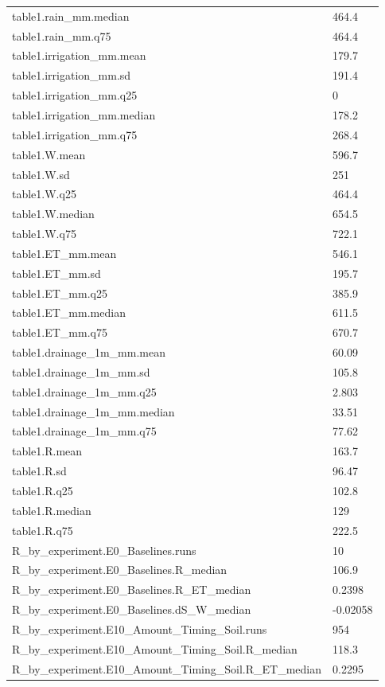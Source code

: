 {\begin{longtable}{p{}p{}}
{}table1.rain\_mm.median & 464.4\\
{}table1.rain\_mm.q75 & 464.4\\
{}table1.irrigation\_mm.mean & 179.7\\
{}table1.irrigation\_mm.sd & 191.4\\
{}table1.irrigation\_mm.q25 & 0\\
{}table1.irrigation\_mm.median & 178.2\\
{}table1.irrigation\_mm.q75 & 268.4\\
{}table1.W.mean & 596.7\\
{}table1.W.sd & 251\\
{}table1.W.q25 & 464.4\\
{}table1.W.median & 654.5\\
{}table1.W.q75 & 722.1\\
{}table1.ET\_mm.mean & 546.1\\
{}table1.ET\_mm.sd & 195.7\\
{}table1.ET\_mm.q25 & 385.9\\
{}table1.ET\_mm.median & 611.5\\
{}table1.ET\_mm.q75 & 670.7\\
{}table1.drainage\_1m\_mm.mean & 60.09\\
{}table1.drainage\_1m\_mm.sd & 105.8\\
{}table1.drainage\_1m\_mm.q25 & 2.803\\
{}table1.drainage\_1m\_mm.median & 33.51\\
{}table1.drainage\_1m\_mm.q75 & 77.62\\
{}table1.R.mean & 163.7\\
{}table1.R.sd & 96.47\\
{}table1.R.q25 & 102.8\\
{}table1.R.median & 129\\
{}table1.R.q75 & 222.5\\
{}R\_by\_experiment.E0\_Baselines.runs & 10\\
{}R\_by\_experiment.E0\_Baselines.R\_median & 106.9\\
{}R\_by\_experiment.E0\_Baselines.R\_ET\_median & 0.2398\\
{}R\_by\_experiment.E0\_Baselines.dS\_W\_median & -0.02058\\
{}R\_by\_experiment.E10\_Amount\_Timing\_Soil.runs & 954\\
{}R\_by\_experiment.E10\_Amount\_Timing\_Soil.R\_median & 118.3\\
{}R\_by\_experiment.E10\_Amount\_Timing\_Soil.R\_ET\_median & 0.2295\\

\end{longtable}}
